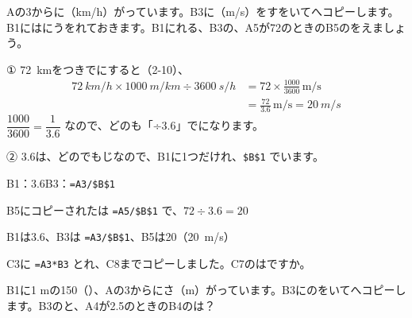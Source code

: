\begin{reidai}
Aの3からに（km/h）がっています。B3に（m/s）をすをいてへコピーします。B1にはにうをれておきます。B1にれる、B3の、A5が72のときのB5のをえましょう。\par
\kangaekata ① \qty{72}{km}をつきでにすると（2-10）、
\begin{align*}
\qty{72}{km/h}\times\qty{1000}{m/km}\div\qty{3600}{s/h}&=72\times\frac{1000}{3600}\,\mathrm{m/s}\\
&=\frac{72}{3.6}\,\mathrm{m/s}=\qty{20}{m/s}
\end{align*}
\hspace*{2.6\zw}$\dfrac{1000}{3600}=\dfrac{1}{3.6}$ なので、どのも「÷3.6」でになります。\par
\hspace*{2.6\zw}② 3.6は、どのでもじなので、B1に1つだけれ、\texttt{\$B\$1} でいます。\par
\shiki B1：3.6\quad B3：\texttt{=A3/\$B\$1}\par
\hspace*{2.6\zw}B5にコピーされたは \texttt{=A5/\$B\$1} で、$72\div3.6=20$\par
\kotae B1は3.6、B3は \texttt{=A3/\$B\$1}、B5は20（\qty{20}{m/s}）
\end{reidai}

\begingroup{}%
\noindent\begin{minipage}[t]{0.49\linewidth}
\begin{jibun}
C3に \texttt{=A3*B3} とれ、C8までコピーしました。C7のはですか。
\end{jibun}
\end{minipage}\hfill
\begin{minipage}[t]{0.49\linewidth}
\begin{jibun}
B1に1 mの150（）、Aの3からにさ（m）がっています。B3にのをいてへコピーします。B3のと、A4が2.5のときのB4のは？
\end{jibun}
\end{minipage}\par
\endgroup



